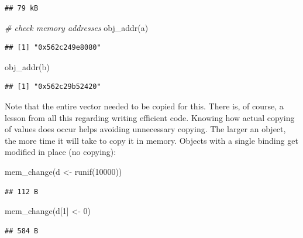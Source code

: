 \documentclass[
  12pt,
]{style/krantz}
\newenvironment{Shaded}{\begin{snugshade}}{\end{snugshade}}
\newcommand{\CommentTok}[1]{\textcolor[rgb]{0.56,0.35,0.01}{\textit{#1}}}
\newcommand{\DecValTok}[1]{\textcolor[rgb]{0.00,0.00,0.81}{#1}}
\newcommand{\FunctionTok}[1]{\textcolor[rgb]{0.00,0.00,0.00}{#1}}
\newcommand{\NormalTok}[1]{#1}
\newcommand{\OtherTok}[1]{\textcolor[rgb]{0.56,0.35,0.01}{#1}}
\begin{document}
\begin{verbatim}
## 79 kB
\end{verbatim}

\begin{Shaded}
\begin{Highlighting}[]
\CommentTok{\# check memory addresses}
\FunctionTok{obj\_addr}\NormalTok{(a)}
\end{Highlighting}
\end{Shaded}

\begin{verbatim}
## [1] "0x562c249e8080"
\end{verbatim}

\begin{Shaded}
\begin{Highlighting}[]
\FunctionTok{obj\_addr}\NormalTok{(b)}
\end{Highlighting}
\end{Shaded}

\begin{verbatim}
## [1] "0x562c29b52420"
\end{verbatim}

Note that the entire vector needed to be copied for this. There is, of course, a lesson from all this regarding writing efficient code. Knowing how actual copying of values does occur helps avoiding unnecessary copying. The larger an object, the more time it will take to copy it in memory. Objects with a single binding get modified in place (no copying):

\begin{Shaded}
\begin{Highlighting}[]
\FunctionTok{mem\_change}\NormalTok{(d }\OtherTok{\textless{}{-}} \FunctionTok{runif}\NormalTok{(}\DecValTok{10000}\NormalTok{))}
\end{Highlighting}
\end{Shaded}

\begin{verbatim}
## 112 B
\end{verbatim}

\begin{Shaded}
\begin{Highlighting}[]
\FunctionTok{mem\_change}\NormalTok{(d[}\DecValTok{1}\NormalTok{] }\OtherTok{\textless{}{-}} \DecValTok{0}\NormalTok{)}
\end{Highlighting}
\end{Shaded}

\begin{verbatim}
## 584 B
\end{verbatim}
\end{document}
